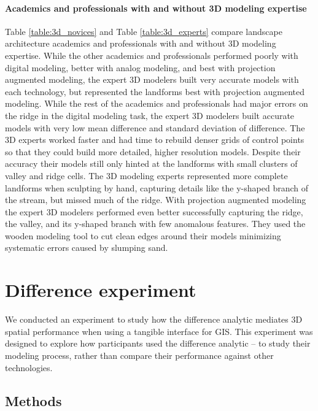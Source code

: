 \documentclass[prodmode,acmtochi]{acmsmall} %
\begin{document}
\paragraph{Academics and professionals with and without 3D modeling expertise}
%
Table \ref{table:3d_novices} and Table \ref{table:3d_experts}
compare landscape architecture academics and professionals 
with and without 3D modeling expertise. 
While the other academics and professionals
performed poorly with digital modeling, 
better with analog modeling, 
and best with projection augmented modeling,
the expert 3D modelers built very accurate models
with each technology, but represented the landforms
best with projection augmented modeling.
While the rest of the academics and professionals 
had major errors on the ridge 
in the digital modeling task,
the expert 3D modelers built accurate models 
with very low mean difference and 
standard deviation of difference. 
The 3D experts worked faster
and had time to rebuild denser grids of control points
so that they could build more detailed,
higher resolution models.
Despite their accuracy their models 
still only hinted at the landforms 
with small clusters of valley and ridge cells. 
The 3D modeling experts represented 
more complete landforms when sculpting by hand,
capturing details like the y-shaped branch of the stream,
but missed much of the ridge. 
With projection augmented modeling 
the expert 3D modelers performed even better
successfully capturing
the ridge, the valley, and its y-shaped branch
with few anomalous features. 
%
They used the wooden modeling tool 
to cut clean edges around their models
minimizing systematic errors caused by slumping sand.

\section{Difference experiment}
We conducted an experiment to study 
how the difference analytic mediates 3D spatial performance 
when using a tangible interface for GIS.
%
This experiment was designed to explore how
participants used the difference analytic 
-- to study their modeling process,
rather than compare their performance against other technologies.  

\subsection{Methods}

% 
%
\end{document}
